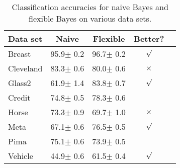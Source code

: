 \begin{table}[t]
\caption{Classification accuracies for naive Bayes and flexible
Bayes on various data sets.}
\label{sample-table}
\vskip 0.15in
\begin{center}
\begin{small}
\begin{sc}
\begin{tabular}{lcccr}
\toprule
Data set & Naive & Flexible & Better? \\
\midrule
Breast    & 95.9$\pm$ 0.2& 96.7$\pm$ 0.2& $\surd$ \\
Cleveland & 83.3$\pm$ 0.6& 80.0$\pm$ 0.6& $\times$\\
Glass2    & 61.9$\pm$ 1.4& 83.8$\pm$ 0.7& $\surd$ \\
Credit    & 74.8$\pm$ 0.5& 78.3$\pm$ 0.6&         \\
Horse     & 73.3$\pm$ 0.9& 69.7$\pm$ 1.0& $\times$\\
Meta      & 67.1$\pm$ 0.6& 76.5$\pm$ 0.5& $\surd$ \\
Pima      & 75.1$\pm$ 0.6& 73.9$\pm$ 0.5&         \\
Vehicle   & 44.9$\pm$ 0.6& 61.5$\pm$ 0.4& $\surd$ \\
\bottomrule
\end{tabular}
\end{sc}
\end{small}
\end{center}
\vskip -0.1in
\end{table}
\fi